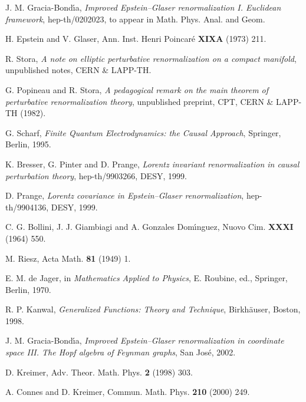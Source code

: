 \documentclass[a4paper,12pt]{article}
\newcommand{\7}{\dagger}           %
\theoremstyle{plain}
\theoremstyle{definition}
\begin{document}
\begin{thebibliography}{34}

J. M. Gracia-Bond\'{\i}a,
\textsl{Improved Epstein--Glaser renormalization I. Euclidean
framework}, hep-th/0202023, to appear in Math. Phys. Anal. and Geom.

H. Epstein and V. Glaser,
Ann. Inst. Henri Poincar\'e {\bf XIXA} (1973) 211.

R. Stora,
\textsl{A note on elliptic perturbative renormalization on a compact
manifold}, unpublished notes, CERN \& LAPP-TH.

G. Popineau and R. Stora,
\textsl{A pedagogical remark on the main theorem of perturbative
renormalization theory},
unpublished preprint, CPT, CERN \& LAPP-TH (1982).

G. Scharf,
\textit{Finite Quantum Electrodynamics: the Causal Approach},
Springer, Berlin, 1995.

K. Bresser, G. Pinter and D. Prange,
\textsl{Lorentz invariant renormalization in causal perturbation
theory},
hep-th/9903266, DESY, 1999.

D. Prange,
\textsl{Lorentz covariance in Epstein--Glaser renormalization},
hep-th/9904136, DESY, 1999.

C. G. Bollini, J. J. Giambiagi and A. Gonzales Dom\'{\i}nguez,
Nuovo Cim. {\bf XXXI} (1964) 550.

M. Riesz,
Acta Math. {\bf 81} (1949) 1.

E. M. de Jager,
in \textit{Mathematics Applied to Physics}, E. Roubine, ed.,
Springer, Berlin, 1970.

R. P. Kanwal,
\textit{Generalized Functions: Theory and Technique},
Birkh\"auser, Boston, 1998.

J. M. Gracia-Bond\'{\i}a,
\textsl{Improved Epstein--Glaser renormalization in coordinate space
III. The Hopf algebra of Feynman graphs}, San Jos\'e, 2002.

D. Kreimer,
Adv. Theor. Math. Phys. {\bf 2} (1998) 303.

A. Connes and D. Kreimer,
Commun. Math. Phys. {\bf 210} (2000) 249.


\end{thebibliography}
\end{document}
